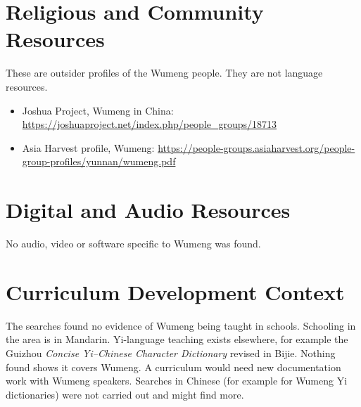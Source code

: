 \documentclass[12pt]{article}
\begin{document}
\section{Religious and Community Resources}
These are outsider profiles of the Wumeng people. They are not language resources.
\begin{itemize}
\item Joshua Project, Wumeng in China: \url{https://joshuaproject.net/index.php/people_groups/18713}
\item Asia Harvest profile, Wumeng: \url{https://people-groups.asiaharvest.org/people-group-profiles/yunnan/wumeng.pdf}
\end{itemize}

\section{Digital and Audio Resources}
No audio, video or software specific to Wumeng was found.

\section{Curriculum Development Context}
The searches found no evidence of Wumeng being taught in schools. Schooling in the area is in Mandarin. Yi-language teaching exists elsewhere, for example the Guizhou \emph{Concise Yi--Chinese Character Dictionary} revised in Bijie. Nothing found shows it covers Wumeng. A curriculum would need new documentation work with Wumeng speakers. Searches in Chinese (for example for Wumeng Yi dictionaries) were not carried out and might find more.
\end{document}

